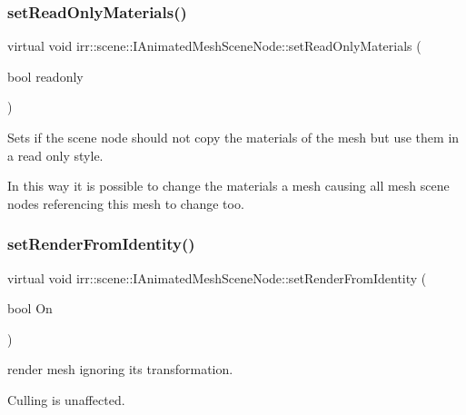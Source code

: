 \subsubsection{\texorpdfstring{set\+Read\+Only\+Materials()}{setReadOnlyMaterials()}\hspace{0.1cm}{\footnotesize\ttfamily [2/2]}}
{\footnotesize\ttfamily virtual void irr\+::scene\+::\+I\+Animated\+Mesh\+Scene\+Node\+::set\+Read\+Only\+Materials (\begin{DoxyParamCaption}\item[{bool}]{readonly }\end{DoxyParamCaption})\hspace{0.3cm}{\ttfamily [pure virtual]}}



Sets if the scene node should not copy the materials of the mesh but use them in a read only style. 

In this way it is possible to change the materials a mesh causing all mesh scene nodes referencing this mesh to change too. \mbox{\label{classirr_1_1scene_1_1IAnimatedMeshSceneNode_aa3aa695d2e949bbc2ff17429951e77d0}} 
\subsubsection{\texorpdfstring{set\+Render\+From\+Identity()}{setRenderFromIdentity()}\hspace{0.1cm}{\footnotesize\ttfamily [1/2]}}
{\footnotesize\ttfamily virtual void irr\+::scene\+::\+I\+Animated\+Mesh\+Scene\+Node\+::set\+Render\+From\+Identity (\begin{DoxyParamCaption}\item[{bool}]{On }\end{DoxyParamCaption})\hspace{0.3cm}{\ttfamily [pure virtual]}}



render mesh ignoring its transformation. 

Culling is unaffected. \mbox{\label{classirr_1_1scene_1_1IAnimatedMeshSceneNode_aa3aa695d2e949bbc2ff17429951e77d0}} 

